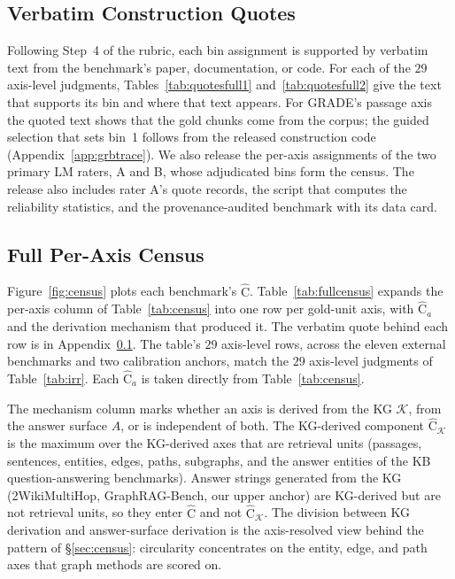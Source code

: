 \documentclass[11pt]{article}
\newcommand{\Chat}{\widehat{\mathrm{C}}}
\newcommand{\kg}{\mathcal{K}}
\begin{document}
\subsection{Verbatim Construction Quotes}
\label{app:quotes}
Following Step~4 of the rubric, each bin assignment is supported by verbatim text from the benchmark's paper, documentation, or code. For each of the $29$ axis-level judgments, Tables~\ref{tab:quotesfull1} and~\ref{tab:quotesfull2} give the text that supports its bin and where that text appears. For GRADE's passage axis the quoted text shows that the gold chunks come from the corpus; the guided selection that sets bin~1 follows from the released construction code (Appendix~\ref{app:grbtrace}). We also release the per-axis assignments of the two primary LM raters, A and B, whose adjudicated bins form the census. The release also includes rater A's quote records, the script that computes the reliability statistics, and the provenance-audited benchmark with its data card.



\subsection{Full Per-Axis Census}
\label{app:fullcensus}
Figure~\ref{fig:census} plots each benchmark's $\Chat$. Table~\ref{tab:fullcensus} expands the per-axis column of Table~\ref{tab:census} into one row per gold-unit axis, with $\Chat_a$ and the derivation mechanism that produced it. The verbatim quote behind each row is in Appendix~\ref{app:quotes}. The table's $29$ axis-level rows, across the eleven external benchmarks and two calibration anchors, match the $29$ axis-level judgments of Table~\ref{tab:irr}. Each $\Chat_a$ is taken directly from Table~\ref{tab:census}.

The mechanism column marks whether an axis is derived from the KG $\kg$, from the answer surface $A$, or is independent of both. The KG-derived component $\Chat_{\kg}$ is the maximum over the KG-derived axes that are retrieval units (passages, sentences, entities, edges, paths, subgraphs, and the answer entities of the KB question-answering benchmarks). Answer strings generated from the KG (2WikiMultiHop, GraphRAG-Bench, our upper anchor) are KG-derived but are not retrieval units, so they enter $\Chat$ and not $\Chat_{\kg}$. The division between KG derivation and answer-surface derivation is the axis-resolved view behind the pattern of \S\ref{sec:census}: circularity concentrates on the entity, edge, and path axes that graph methods are scored on.
\end{document}
